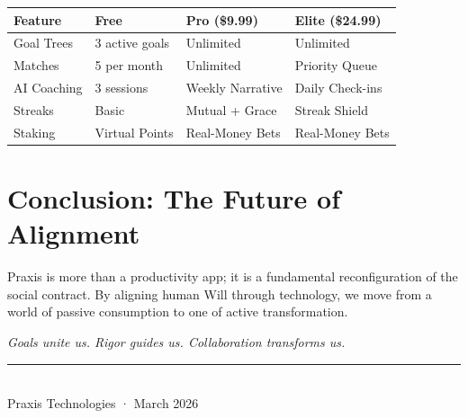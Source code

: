 \documentclass[11pt,a4paper,oneside]{article}
\begin{document}
\begin{center}
\begin{tabularx}{\linewidth}{l X X X}
\toprule
\textbf{Feature} & \textbf{Free} & \textbf{Pro (\$9.99)} & \textbf{Elite (\$24.99)} \\
\midrule
Goal Trees & 3 active goals & Unlimited & Unlimited \\
Matches & 5 per month & Unlimited & Priority Queue \\
AI Coaching & 3 sessions & Weekly Narrative & Daily Check-ins \\
Streaks & Basic & Mutual + Grace & Streak Shield \\
Staking & Virtual Points & Real-Money Bets & Real-Money Bets \\
\bottomrule
\end{tabularx}
\end{center}

\section{Conclusion: The Future of Alignment}

Praxis is more than a productivity app; it is a fundamental reconfiguration of the social contract. By aligning human Will through technology, we move from a world of passive consumption to one of active transformation. 

\textit{Goals unite us. Rigor guides us. Collaboration transforms us.}

\bigskip
\begin{center}
\textcolor{praxisBlue}{\rule{6cm}{1pt}} \\
\small\textcolor{praxisGray}{Praxis Technologies · March 2026}
\end{center}
\end{document}
